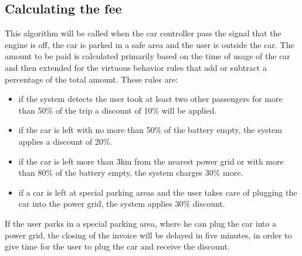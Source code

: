 \documentclass[a4paper]{article}
\begin{document}
\subsection{Calculating the fee}
This algorithm will be called when the car controller pass the signal that the engine is off, the car is parked in a safe area and the user is outside the car. \newline
The amount to be paid is calculated primarily based on the time of usage of the car and then extended for the virtuous behavior rules that add or subtract a percentage of the total amount. 
 These rules are:
\begin{itemize} 
\item  if the system detects the user took at least two other passengers for more than 50\% of the trip a discount of 10\% will be applied.
\item if the car is left with no more than 50\% of the battery empty, the system applies a discount of 20\%.
\item if the car is left more than 3km from the nearest power grid or with more than 80\% of the battery empty, the system charges 30\% more.
\item if a car is left at special parking areas and the user takes care of plugging the car into the power grid, the system applies 30\% discount.
\end{itemize}
If the user parks in a special parking area, where he can plug the car into a power grid, the closing of the invoice will be delayed in five minutes, in order to give time for the user to plug the car and receive the discount. 
\end{document}

